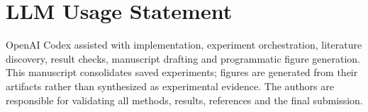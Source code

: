 \documentclass[10pt,twocolumn,letterpaper]{article}
\begin{document}
\clearpage
\section*{LLM Usage Statement}
OpenAI Codex assisted with implementation, experiment orchestration, literature discovery, result checks, manuscript drafting and programmatic figure generation. This manuscript consolidates saved experiments; figures are generated from their artifacts rather than synthesized as experimental evidence. The authors are responsible for validating all methods, results, references and the final submission.
{\small}
\end{document}
